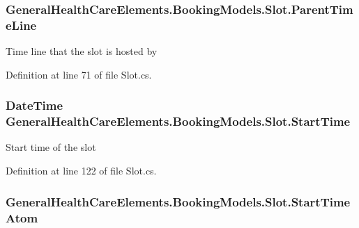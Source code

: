 \subsubsection[{\texorpdfstring{Parent\+Time\+Line}{ParentTimeLine}}]{ General\+Health\+Care\+Elements.\+Booking\+Models.\+Slot.\+Parent\+Time\+Line\hspace{0.3cm}{\ttfamily [get]}}\hypertarget{class_general_health_care_elements_1_1_booking_models_1_1_slot_aa5833a76b9e2b9c46b76a4a772af18d8}{}\label{class_general_health_care_elements_1_1_booking_models_1_1_slot_aa5833a76b9e2b9c46b76a4a772af18d8}


Time line that the slot is hosted by 



Definition at line 71 of file Slot.\+cs.

\subsubsection[{\texorpdfstring{Start\+Time}{StartTime}}]{\setlength{\rightskip}{0pt plus 5cm}Date\+Time General\+Health\+Care\+Elements.\+Booking\+Models.\+Slot.\+Start\+Time\hspace{0.3cm}{\ttfamily [get]}}\hypertarget{class_general_health_care_elements_1_1_booking_models_1_1_slot_a385977f2e257d3e0e290f37750a214b9}{}\label{class_general_health_care_elements_1_1_booking_models_1_1_slot_a385977f2e257d3e0e290f37750a214b9}


Start time of the slot 



Definition at line 122 of file Slot.\+cs.

\subsubsection[{\texorpdfstring{Start\+Time\+Atom}{StartTimeAtom}}]{ General\+Health\+Care\+Elements.\+Booking\+Models.\+Slot.\+Start\+Time\+Atom\hspace{0.3cm}{\ttfamily [get]}}\hypertarget{class_general_health_care_elements_1_1_booking_models_1_1_slot_a96b73738a63d0bef0b27377088099c36}{}\label{class_general_health_care_elements_1_1_booking_models_1_1_slot_a96b73738a63d0bef0b27377088099c36}


